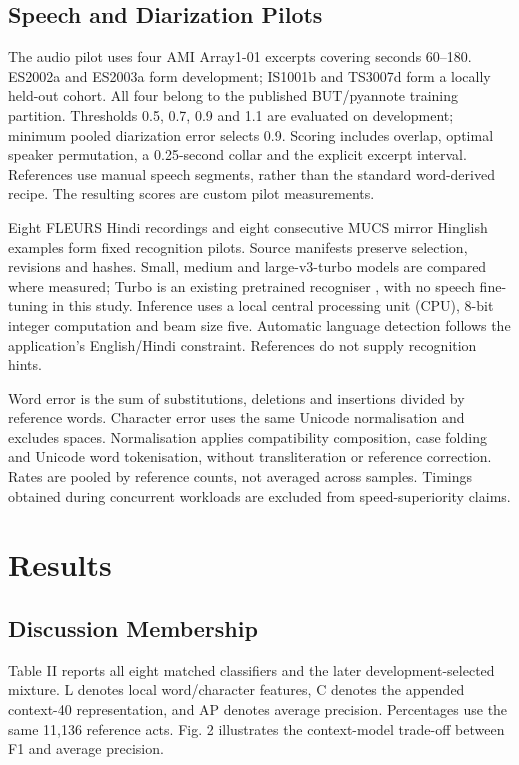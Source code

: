 \documentclass[conference,a4paper]{IEEEtran}
\begin{document}
\subsection{Speech and Diarization Pilots}
The audio pilot uses four AMI Array1-01 excerpts covering seconds 60--180. ES2002a and ES2003a form development; IS1001b and TS3007d form a locally held-out cohort. All four belong to the published BUT/pyannote training partition. Thresholds 0.5, 0.7, 0.9 and 1.1 are evaluated on development; minimum pooled diarization error selects 0.9. Scoring includes overlap, optimal speaker permutation, a 0.25-second collar and the explicit excerpt interval. References use manual speech segments, rather than the standard word-derived recipe. The resulting scores are custom pilot measurements.

Eight FLEURS Hindi recordings \cite{ref13} and eight consecutive MUCS mirror Hinglish examples \cite{ref14} form fixed recognition pilots. Source manifests preserve selection, revisions and hashes. Small, medium and large-v3-turbo models are compared where measured; Turbo is an existing pretrained recogniser \cite{ref15}, with no speech fine-tuning in this study. Inference uses a local central processing unit (CPU), 8-bit integer computation and beam size five. Automatic language detection follows the application's English/Hindi constraint. References do not supply recognition hints.

Word error is the sum of substitutions, deletions and insertions divided by reference words. Character error uses the same Unicode normalisation and excludes spaces. Normalisation applies compatibility composition, case folding and Unicode word tokenisation, without transliteration or reference correction. Rates are pooled by reference counts, not averaged across samples. Timings obtained during concurrent workloads are excluded from speed-superiority claims.

\section{Results}
\subsection{Discussion Membership}
Table II reports all eight matched classifiers and the later development-selected mixture. L denotes local word/character features, C denotes the appended context-40 representation, and AP denotes average precision. Percentages use the same 11,136 reference acts. Fig. 2 illustrates the context-model trade-off between F1 and average precision.
\end{document}
